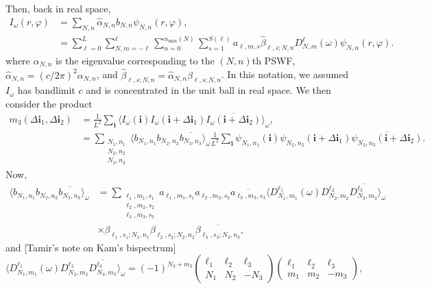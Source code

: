 \documentclass[english,11pt]{article}
\newcommand{\1}{\mathbf{1}}
\newcommand{\mb}{\mathbf}
\numberwithin{equation}{section}
\theoremstyle{plain}
\theoremstyle{definition}
\theoremstyle{remark}
\theoremstyle{plain}
\theoremstyle{remark}
\theoremstyle{plain}
\theoremstyle{plain}
\begin{document}
Then, back in real space,
\[\begin{aligned} I_{\omega}(r,\varphi) &= \sum_{N,n}\widehat{\alpha}_{N,n}b_{N,n}\psi_{N,n}(r,\varphi),\\
&= \sum_{\ell=0}^L\sum_{N,m=-\ell}^{\ell}\sum_{n=0}^{n_{\text{max}}(N)}\sum_{s=1}^{S(\ell)}a_{\ell,m,s}\widehat\beta_{\ell,s;N,n}D_{N,m}^{\ell}(\omega)\psi_{N,n}(r,\varphi).
\end{aligned}\]
where $\alpha_{N,n}$ is the eigenvalue corresponding to the $(N,n)$th PSWF, $\widehat{\alpha}_{N,n} = (c/2\pi)^2\alpha_{N,n}$, and $\widehat\beta_{\ell,s;N,n}=\widehat\alpha_{N,n}\beta_{\ell,s;N,n}$. In this notation, we assumed $I_{\omega}$ has bandlimit $c$ and is concentrated in the unit ball in real space. We then consider the product
\[\begin{aligned} m_3(\Delta\mb i_1,\Delta\mb i_2) &= \frac{1}{L^2}\sum_{\mb i}\langle I_{\omega}(\mb i)I_{\omega}(\mb i+\Delta\mb i_1)\overline{I_{\omega}(\mb i+\Delta\mb i_2)}\rangle_{\omega},\\
&= \sum_{\substack{N_1,n_1\\N_2,n_2\\N_3,n_3}} \langle b_{N_1,n_1}b_{N_2,n_2}\overline{b_{N_3,n_3}}\rangle_{\omega}\frac{1}{L^2}\sum_{\mb i}\psi_{N_1,n_1}(\mb i)\psi_{N_2,n_2}(\mb i+\Delta\mb i_1)\overline{\psi_{N_3,n_3}(\mb i+\Delta\mb i_2)}.\end{aligned}\]
Now,
\[\begin{aligned} \langle b_{N_1,n_1}b_{N_2,n_2}\overline{b_{N_3,n_3}}\rangle_{\omega} &= \sum_{\substack{\ell_1,m_1,s_1\\\ell_2,m_2,s_2\\\ell_3,m_3,s_3}}a_{\ell_1,m_1,s_1}a_{\ell_2,m_2,s_2}\overline{a_{\ell_3,m_3,s_3}}\langle D_{N_1,m_1}^{\ell_1}(\omega)D_{N_2,m_2}^{\ell_2}\overline{D_{N_3,m_3}^{\ell_3}}\rangle_{\omega}\\
&\times \beta_{\ell_1,s_1;N_1,n_1}\beta_{\ell_2,s_2;N_2,n_2}\overline{\beta_{\ell_3,s_3;N_3,n_3}},\end{aligned}\]
and [Tamir's note on Kam's bispectrum]
\[ \langle D_{N_1,m_1}^{\ell_1}(\omega)D_{N_2,m_2}^{\ell_2}\overline{D_{N_3,m_3}^{\ell_3}}\rangle_{\omega} = (-1)^{N_3+m_3}\left(\begin{array}{ccc}\ell_1 & \ell_2  & \ell_3\\ N_1 & N_2 & -N_3\end{array}\right)\left(\begin{array}{ccc}\ell_1 & \ell_2  & \ell_3\\ m_1 & m_2 & -m_3\end{array}\right),\
\]
\end{document}
